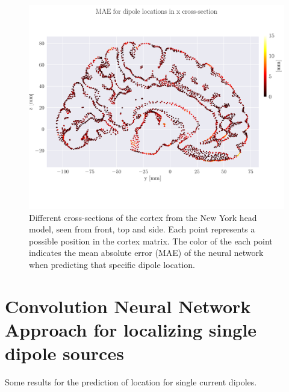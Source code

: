\documentclass[a4paper, UKenglish, 11pt]{uiomaster}
\begin{document}
\begin{figure}[!htb]
    \vspace{10pt} %
    \includegraphics[width=0.7\linewidth]{figures/NEW_simple_dipole_error_Euclidean Distance_2.pdf}
    \caption{Different cross-sections of the cortex from the New York head model, seen from front, top and side. Each point represents a possible position in the cortex matrix. The color of the each point indicates the mean absolute error (MAE) of the neural network when predicting that specific dipole location.}
    \label{fig:MAE_crossections}
\end{figure}



\section{Convolution Neural Network Approach for localizing single dipole sources}

Some results for the prediction of location for single current dipoles.
\end{document}
